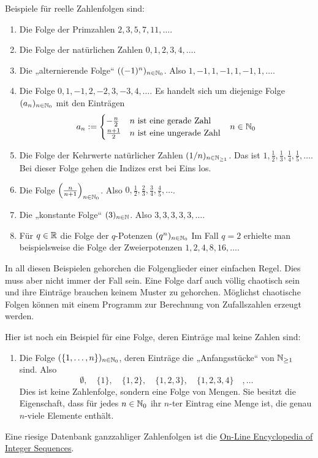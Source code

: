 \begin{bsp}
    Beispiele für reelle Zahlenfolgen sind:
    \begin{enumerate}
        \item Die Folge der Primzahlen $2,3,5,7,11,\dots$.
        \item Die Folge der natürlichen Zahlen $0,1,2,3,4,\dots$.
        \item Die „alternierende Folge“ $((-1)^n)_{n\in \mathbb N_0}$. Also $1,-1,1,-1,1,-1,1,\dots$.
        \item Die Folge $0,1,-1,2,-2,3,-3,4,\dots$. Es handelt sich um diejenige Folge $(a_n)_{n\in \mathbb N_0}$ mit den Einträgen
        \begin{align*}
            a_n := \begin{cases}
                -\frac{n}{2} & n\ \text{ist eine gerade Zahl} \\
                \frac{n+1}{2} & n\ \text{ist eine ungerade Zahl}
            \end{cases} && n \in \mathbb N_0
        \end{align*}
        \item Die Folge der Kehrwerte natürlicher Zahlen $(1/n)_{n\in \mathbb N_{\ge 1}}$. Das ist  $1,\frac{1}{2},\frac{1}{3},\frac{1}{4},\frac{1}{5},\dots$. Bei dieser Folge gehen die Indizes erst bei Eins los.
        \item Die Folge $\left(\frac{n}{n+1}\right)_{n\in \mathbb N_0}$. Also $0,\frac{1}{2},\frac{2}{3},\frac{3}{4},\frac{4}{5},\dots$.
        \item Die „konstante Folge“ $(3)_{n\in \mathbb N}$. Also $3,3,3,3,3,\dots$.
        \item Für $q\in \mathbb R$ die Folge der $q$-Potenzen $(q^n)_{n\in \mathbb N_0}$ Im Fall $q=2$ erhielte man beispielsweise die Folge der Zweierpotenzen $1,2,4,8,16,\dots$.
    \end{enumerate}
    In all diesen Beispielen gehorchen die Folgenglieder einer einfachen Regel. Dies muss aber nicht immer der Fall sein. Eine Folge darf auch völlig chaotisch sein und ihre Einträge brauchen keinem Muster zu gehorchen. Möglichst chaotische Folgen können mit einem Programm zur Berechnung von Zufallszahlen erzeugt werden.
        
    Hier ist noch ein Beispiel für eine Folge, deren Einträge mal keine Zahlen sind:
    \begin{enumerate}[(9)]
        \item Die Folge $(\{1,\dots , n\})_{n\in \mathbb N_0}$, deren Einträge die „Anfangsstücke“ von $\mathbb N_{\ge 1}$ sind. Also
            \[ \emptyset,\quad \{1\},\quad \{1,2\},\quad \{1,2,3\},\quad \{1,2,3,4\}\quad,\dots \]
        Dies ist keine Zahlenfolge, sondern eine Folge von Mengen. Sie besitzt die Eigenschaft, dass für jedes $n\in \mathbb N_0$ ihr $n$-ter Eintrag eine Menge ist, die genau $n$-viele Elemente enthält.
    \end{enumerate}
    Eine riesige Datenbank ganzzahliger Zahlenfolgen ist die \href{https://oeis.org/}{On-Line Encyclopedia of Integer Sequences}.
\end{bsp}


